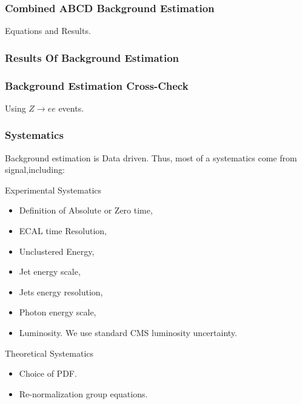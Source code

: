 \documentclass{beamer}
\begin{document}
\begin{frame}
\frametitle{Combined ABCD Background Estimation}
  Equations and Results.
 \begin{minipage}[t]{0.8\linewidth}

 \end{minipage}
 
 \begin{tcolorbox}[colback=UNL@Cream!5,colframe=UMN@Maroon!40,title=\textcolor{black}{\textbf{Closure Test Results: $0$,$1$-Jet Events}}]
 
 
 \end{tcolorbox}
 \begin{minipage}[t]{0.8\linewidth}

 \end{minipage}
\end{frame}

\begin{frame}
\frametitle{Results Of Background Estimation}

\end{frame}



\begin{frame}
\frametitle{Background Estimation Cross-Check}
Using $Z \rightarrow ee$ events.
\end{frame}





\begin{frame}
\frametitle{ Systematics}
 \begin{minipage}[t]{0.8\linewidth}
  Background estimation is Data driven.
  Thus, most of a systematics come from signal,including:
  \begin{varblock}[7cm]{Experimental Systematics}
   \begin{itemize}
    \item Definition of Absolute or Zero time,
    \item ECAL time Resolution,    
    \item Unclustered Energy,
    \item Jet energy scale,
    \item Jets energy resolution,
    \item Photon energy scale,
    \item Luminosity. We use standard CMS luminosity uncertainty.
   \end{itemize}
  \end{varblock}  
  \begin{varblock}[7cm]{Theoretical Systematics}
   \begin{itemize}   
   \item Choice of PDF.
   \item Re-normalization group equations.
   \end{itemize}
  \end{varblock} 
\end{minipage}
\end{frame}
\end{document}
